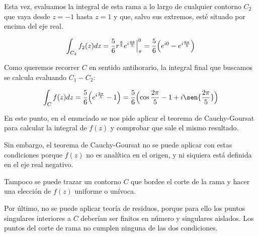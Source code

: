 \begin{enumerate}
    Esta vez, evaluamos la integral de esta rama a lo largo de cualquier contorno $C_2$ que vaya desde $z = -1$ hasta $z = 1$ y que,
    salvo sus extremos, esté situado por encima del eje real.

    \begin{equation*}
        \int_{C_2} f_2(z) dz = \frac{5}{6} r^{\frac{6}{5}} e^{i\frac{6\theta}{5}} \Big|_\pi^{0} =
        \frac{5}{6}\Bigl(e^{i0} - e^{i\frac{6\pi}{5}} \Bigr)
    \end{equation*}

    Como queremos recorrer $C$ en sentido antihorario, la integral final que buscamos se calcula evaluando $C_1 - C_2$:

    \begin{equation*}
        \int_{C} f(z) dz = \frac{5}{6} \Bigl( e^{i\frac{2\pi}{5}} -1 \Bigr) =
        \frac{5}{6} \Bigl(  \cos{\frac{2\pi}{5}} - 1 + i \sen{\frac{2\pi}{5}} \Bigr)
    \end{equation*}


    \vspace{20px}
    En este punto, en el enunciado se nos pide aplicar el teorema de Cauchy-Goursat para calcular la integral de $f(z)$
    y comprobar que sale el mismo resultado.

    Sin embargo, el teorema de Cauchy-Goursat no se puede aplicar con estas condiciones
    porque $f(z)$ no es analítica en el origen, y ni siquiera está
    definida en el eje real negativo.

    Tampoco se puede trazar un contorno $C$ que bordee el corte de la rama y hacer una elección de $f(z)$ uniforme o unívoca.

    Por último, no se puede aplicar teoría de residuos, porque para ello los puntos singulares interiores a $C$ deberían
    ser finitos en número y singulares aislados. Los puntos del corte de rama no cumplen ninguna de las dos condiciones.


\end{enumerate}